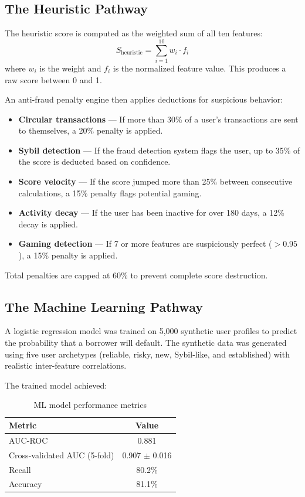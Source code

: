 \documentclass[12pt, a4paper]{article}
\begin{document}
\subsection{The Heuristic Pathway}

The heuristic score is computed as the weighted sum of all ten features:
\[
S_{\text{heuristic}} = \sum_{i=1}^{10} w_i \cdot f_i
\]
where $w_i$ is the weight and $f_i$ is the normalized feature value. This produces a raw score between 0 and 1.

An anti-fraud penalty engine then applies deductions for suspicious behavior:

\begin{itemize}[nosep]
    \item \textbf{Circular transactions} --- If more than 30\% of a user's transactions are sent to themselves, a 20\% penalty is applied.
    \item \textbf{Sybil detection} --- If the fraud detection system flags the user, up to 35\% of the score is deducted based on confidence.
    \item \textbf{Score velocity} --- If the score jumped more than 25\% between consecutive calculations, a 15\% penalty flags potential gaming.
    \item \textbf{Activity decay} --- If the user has been inactive for over 180 days, a 12\% decay is applied.
    \item \textbf{Gaming detection} --- If 7 or more features are suspiciously perfect ($>0.95$), a 15\% penalty is applied.
\end{itemize}

Total penalties are capped at 60\% to prevent complete score destruction.

\subsection{The Machine Learning Pathway}

A logistic regression model was trained on 5,000 synthetic user profiles to predict the probability that a borrower will default. The synthetic data was generated using five user archetypes (reliable, risky, new, Sybil-like, and established) with realistic inter-feature correlations.

The trained model achieved:

\begin{table}[H]
\centering
\caption{ML model performance metrics}
\begin{tabular}{l c}
\toprule
\textbf{Metric} & \textbf{Value} \\
\midrule
AUC-ROC & 0.881 \\
Cross-validated AUC (5-fold) & 0.907 $\pm$ 0.016 \\
Recall & 80.2\% \\
Accuracy & 81.1\% \\
\bottomrule
\end{tabular}
\end{table}
\end{document}
